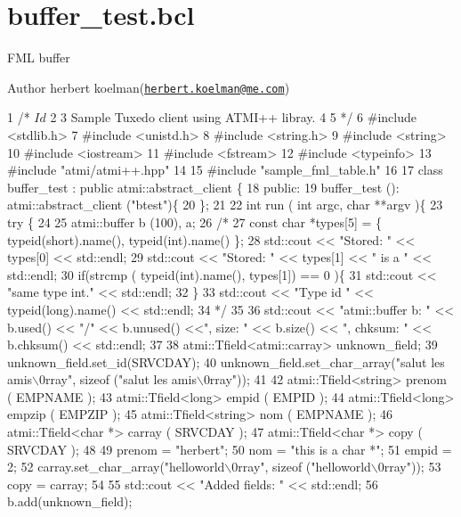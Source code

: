 \hypertarget{buffer_test_8bcl-example}{\section{buffer\+\_\+test.\+bcl}
}
F\+M\+L buffer

\begin{DoxyAuthor}{Author}
herbert koelman(\href{mailto:herbert.koelman@me.com}{\tt herbert.\+koelman@me.\+com})
\end{DoxyAuthor}

\begin{DoxyCodeInclude}
1 /* $Id$
2 
3    Sample Tuxedo client using ATMI++ libray.
4 
5  */
6 #include <stdlib.h>
7 #include <unistd.h>
8 #include <string.h>
9 #include <string>
10 #include <iostream>
11 #include <fstream>
12 #include <typeinfo>
13 #include "atmi/atmi++.hpp"
14 
15 #include "sample\_fml\_table.h"
16 
17 class buffer\_test : public atmi::abstract\_client \{
18   public:
19     buffer\_test (): atmi::abstract\_client ("btest")\{
20     \};
21 
22     int run ( int argc, char **argv )\{
23       try \{
24 
25         atmi::buffer b (100), a;
26         /*
27            const char *types[5] = \{ typeid(short).name(), typeid(int).name() \};
28            std::cout << "Stored: " << types[0] << std::endl;
29            std::cout << "Stored: " << types[1] << " is a " << std::endl;
30            if(strcmp ( typeid(int).name(), types[1]) == 0 )\{
31            std::cout << "same type int." << std::endl;
32            \}
33            std::cout << "Type id " << typeid(long).name() << std::endl;
34          */
35 
36         std::cout << "atmi::buffer b: " << b.used() << "/" << b.unused() <<", size: " << b.size() << ",
       chksum: " << b.chksum() <<  std::endl;
37 
38         atmi::Tfield<atmi::carray>   unknown\_field;
39         unknown\_field.set\_id(SRVCDAY);
40         unknown\_field.set\_char\_array("salut les amis\(\backslash\)0rray", sizeof ("salut les amis\(\backslash\)0rray"));
41 
42         atmi::Tfield<string> prenom ( EMPNAME );
43         atmi::Tfield<long>   empid ( EMPID );
44         atmi::Tfield<long>   empzip ( EMPZIP );
45         atmi::Tfield<string> nom ( EMPNAME );
46         atmi::Tfield<char *> carray ( SRVCDAY );
47         atmi::Tfield<char *> copy ( SRVCDAY );
48 
49         prenom = "herbert";
50         nom = "this is a char *";
51         empid = 2;
52         carray.set\_char\_array("helloworld\(\backslash\)0rray", sizeof ("helloworld\(\backslash\)0rray"));
53         copy = carray;
54 
55         std::cout << "Added fields: " << std::endl;
56         b.add(unknown\_field);

\end{DoxyCodeInclude}

